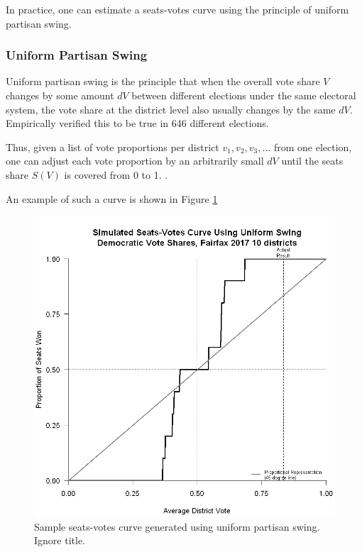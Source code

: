 In practice, one can estimate a seats-votes curve using the principle of uniform partisan swing.

\subsubsection{Uniform Partisan Swing}

Uniform partisan swing is the principle that when the overall vote share $V$ changes by some amount $dV$ between different elections under the same electoral system, the vote share at the district level also usually changes by the same $dV$. \textcite{katz2020} Empirically verified this to be true in 646 different elections. 

Thus, given a list of vote proportions per district ${v_1, v_2, v_3, ...}$ from one election, one can adjust each vote proportion by an arbitrarily small $dV$ until the seats share $S(V)$ is covered from 0 to 1. \parencite{katz2020}.

An example of such a curve is shown in Figure \ref{fig:seatsvotesups1}

\begin{figure}
    \includegraphics[width=0.5\linewidth]{img/seatsvotesups.png}
    \caption{Sample seats-votes curve generated using uniform partisan swing. Ignore title. \parencite[175]{katz2020}}
    \label{fig:seatsvotesups1}
\end{figure}

